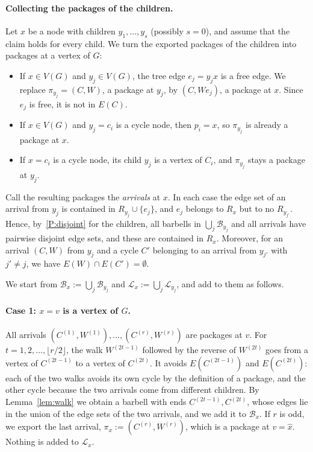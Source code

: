 \documentclass[11pt,a4paper]{article}
\theoremstyle{definition}
\theoremstyle{remark}
\begin{document}
\paragraph{Collecting the packages of the children.}
Let \(x\) be a node with children \(y_1,\dots,y_s\) (possibly \(s=0\)), and
assume that the claim holds for every child. We turn the exported packages of
the children into packages at a vertex of \(G\):
\begin{itemize}
\item If \(x\in V(G)\) and \(y_j\in V(G)\), the tree edge \(e_j=y_jx\) is a
  free edge. We replace \(\pi_{y_j}=(C,W)\), a package at \(y_j\), by
  \((C,We_j)\), a package at \(x\). Since \(e_j\) is free, it is not in
  \(E(C)\).
\item If \(x\in V(G)\) and \(y_j=c_i\) is a cycle node, then \(p_i=x\), so
  \(\pi_{y_j}\) is already a package at \(x\).
\item If \(x=c_i\) is a cycle node, its child \(y_j\) is a vertex of \(C_i\),
  and \(\pi_{y_j}\) stays a package at \(y_j\).
\end{itemize}
Call the resulting packages the \emph{arrivals} at \(x\). In each case the edge
set of an arrival from \(y_j\) is contained in \(R_{y_j}\cup\{e_j\}\), and
\(e_j\) belongs to \(R_x\) but to no \(R_{y_{j'}}\). Hence, by~\ref{P:disjoint}
for the children, all barbells in \(\bigcup_j\mathcal B_{y_j}\) and all arrivals
have pairwise disjoint edge sets, and these are contained in \(R_x\). Moreover,
for an arrival \((C,W)\) from \(y_j\) and a cycle \(C'\) belonging to an arrival
from \(y_{j'}\) with \(j'\ne j\), we have \(E(W)\cap E(C')=\emptyset\).

We start from
\(\mathcal B_x:=\bigcup_j\mathcal B_{y_j}\) and
\(\mathcal L_x:=\bigcup_j\mathcal L_{y_j}\), and add to them as follows.

\paragraph{Case 1: \(x=v\) is a vertex of \(G\).}
All arrivals \((C^{(1)},W^{(1)}),\dots,(C^{(r)},W^{(r)})\) are packages at
\(v\). For \(t=1,2,\dots,\lfloor r/2\rfloor\), the walk
\(W^{(2t-1)}\) followed by the reverse of \(W^{(2t)}\) goes from a vertex of
\(C^{(2t-1)}\) to a vertex of \(C^{(2t)}\). It avoids \(E(C^{(2t-1)})\) and
\(E(C^{(2t)})\): each of the two walks avoids its own cycle by the definition
of a package, and the other cycle because the two arrivals come from different
children. By Lemma~\ref{lem:walk} we obtain a barbell with ends
\(C^{(2t-1)},C^{(2t)}\), whose edges lie in the union of the edge sets of the
two arrivals, and we add it to \(\mathcal B_x\). If \(r\) is odd, we export the
last arrival, \(\pi_x:=(C^{(r)},W^{(r)})\), which is a package at \(v=\hat x\).
Nothing is added to \(\mathcal L_x\).
\end{document}
